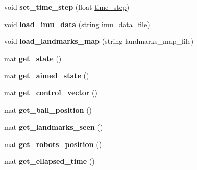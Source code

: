 \begin{DoxyCompactItemize}
\item 
\mbox{\label{class_robot_navigation_a5f47abc9fd8fe81c2d4df33cd732a84a}} 
void {\bfseries set\+\_\+time\+\_\+step} (float \hyperlink{class_robot_navigation_a1f1de08123eaff99571bb21fa411d4dd}{time\+\_\+step})
\item 
\mbox{\label{class_robot_navigation_af1ec4d21b09907e7c849ab603a173484}} 
void {\bfseries load\+\_\+imu\+\_\+data} (string imu\+\_\+data\+\_\+file)
\item 
\mbox{\label{class_robot_navigation_af936fdf445213270848a4fc881d1cdb7}} 
void {\bfseries load\+\_\+landmarks\+\_\+map} (string landmarks\+\_\+map\+\_\+file)
\item 
\mbox{\label{class_robot_navigation_a3ecd5c2f6f316b4b41b48cb0c28a944e}} 
mat {\bfseries get\+\_\+state} ()
\item 
\mbox{\label{class_robot_navigation_aa56d5bc1153358167a4ea2521050a0b9}} 
mat {\bfseries get\+\_\+aimed\+\_\+state} ()
\item 
\mbox{\label{class_robot_navigation_a825a8172dc71450817593b0dcd6c6dc2}} 
mat {\bfseries get\+\_\+control\+\_\+vector} ()
\item 
\mbox{\label{class_robot_navigation_ab04ff3cecd3441e13588f1a2c78f4e2c}} 
mat {\bfseries get\+\_\+ball\+\_\+position} ()
\item 
\mbox{\label{class_robot_navigation_acc50daa5ac82e2900f87d2b312afc518}} 
mat {\bfseries get\+\_\+landmarks\+\_\+seen} ()
\item 
\mbox{\label{class_robot_navigation_a9082eefeea50d92c1cf1ea07620733c3}} 
mat {\bfseries get\+\_\+robots\+\_\+position} ()
\item 
\mbox{\label{class_robot_navigation_a63b9ea0c29057b9be47cccff6010eb8b}} 
mat {\bfseries get\+\_\+ellapsed\+\_\+time} ()
\item 
\mbox{\label{class_robot_navigation_a81ea2b1ff7b0701a716ab6b8bac92be4}} 

\end{DoxyCompactItemize}
